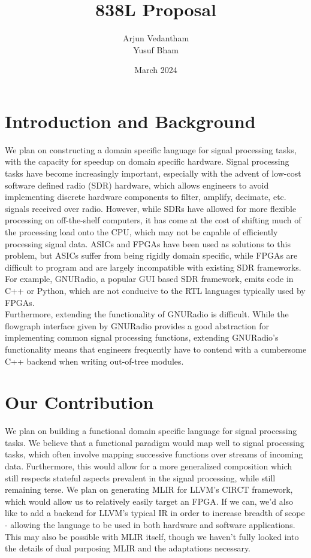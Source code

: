 \documentclass{article}
\title{838L Proposal}
\author{Arjun Vedantham \\ Yusuf Bham}
\date{March 2024}
\begin{document}
\maketitle

\section{Introduction and Background}
We plan on constructing a domain specific language for signal processing tasks, with the capacity for speedup on domain specific hardware. Signal processing tasks have become increasingly important, especially with the advent of low-cost software defined radio (SDR) hardware, which allows engineers to avoid implementing discrete hardware components to filter, amplify, decimate, etc. signals received over radio. However, while SDRs have allowed for more flexible processing on off-the-shelf computers, it has come at the cost of shifting much of the processing load onto the CPU, which may not be capable of efficiently processing signal data. ASICs and FPGAs have been used as solutions to this problem, but ASICs suffer from being rigidly domain specific, while FPGAs are difficult to program and are largely incompatible with existing SDR frameworks. For example, GNURadio, a popular GUI based SDR framework, emits code in C++ or Python, which are not conducive to the RTL languages typically used by FPGAs. \\

Furthermore, extending the functionality of GNURadio is difficult. While the flowgraph interface given by GNURadio provides a good abstraction for implementing common signal processing functions, extending GNURadio's functionality means that engineers frequently have to contend with a cumbersome C++ backend when writing out-of-tree modules. 

\section{Our Contribution}
We plan on building a functional domain specific language for signal processing tasks. We believe that a functional paradigm would map well to signal processing tasks, which often involve mapping successive functions over streams of incoming data. Furthermore, this would allow for a more generalized composition which still respects stateful aspects prevalent in the signal processing, while still remaining terse. We plan on generating MLIR for LLVM's CIRCT framework, which would allow us to relatively easily target an FPGA. If we can, we'd also like to add a backend for LLVM's typical IR in order to increase breadth of scope - allowing the language to be used in both hardware and software applications. This may also be possible with MLIR itself, though we haven't fully looked into the details of dual purposing MLIR and the adaptations necessary. \\
\end{document}
